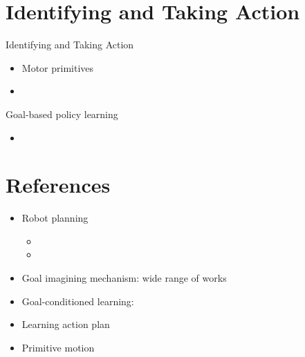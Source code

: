 \section{Identifying and Taking Action}
Identifying and Taking Action

\begin{itemize}
	\item Motor primitives 
	\item \todo{}
\end{itemize}

Goal-based policy learning
\begin{itemize}
	\item 
\end{itemize}

\section{References}
\todo{}
\begin{itemize}
	\item Robot planning
	\begin{itemize}
		\item {}
		\item {}
	\end{itemize}
	\item Goal imagining mechanism: wide range of works
	\item Goal-conditioned learning:
	\item Learning action plan
	\item Primitive motion
\end{itemize}